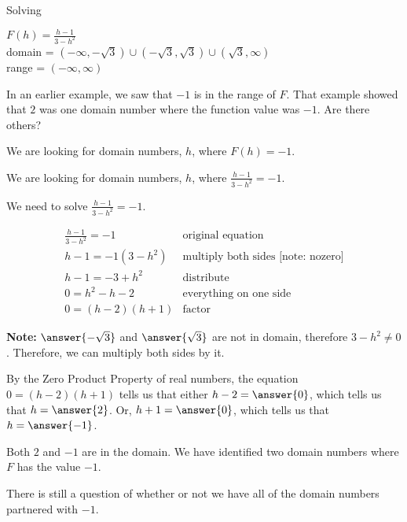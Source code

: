 \documentclass{ximera}
\begin{document}
\begin{example}   Solving 

$F(h) = \frac{h-1}{3-h^2}$ \\
domain = $(-\infty, -\sqrt{3}) \cup (-\sqrt{3}, \sqrt{3}) \cup (\sqrt{3}, \infty)$ \\
range = $(-\infty, \infty)$


In an earlier example, we saw that $-1$ is in the range of $F$.  That example showed that $2$ was one domain number where the function value was $-1$. Are there others?


We are looking for domain numbers, $h$, where $F(h) = -1$.  

We are looking for domain numbers, $h$, where $\frac{h-1}{3-h^2} = -1$.  

We need to solve $\frac{h-1}{3-h^2} = -1$.



\[
\begin{array}{ll}
\frac{h-1}{3-h^2} = -1 &  \text{original equation} \\
h - 1 = -1 (3-h^2)    &  \text{multiply both sides [note: nozero]} \\
h - 1 = -3 + h^2    &      \text{distribute} \\
0 = h^2 - h - 2    &      \text{everything on one side} \\
0 =(h-2)(h+1)    &   \text{factor}   
\end{array}
\]


\begin{remark}
\textbf{Note:}  $\answer{-\sqrt{3}}$ and $\answer{\sqrt{3}}$ are not in domain, therefore $3 - h^2 \ne 0$. Therefore, we can multiply both sides by it.  
\end{remark}


By the Zero Product Property of real numbers, the equation $0 =(h-2)(h+1)$ tells us that either $h-2 = \answer{0}$, which tells us that $h = \answer{2}$. Or, $h+1 = \answer{0}$, which tells us that $h = \answer{-1}$.

Both $2$ and $-1$ are in the domain.  We have identified two domain numbers where $F$ has the value $-1$.



\end{example}
There is still a question of whether or not we have all of the domain numbers partnered with $-1$. \\
\end{document}
